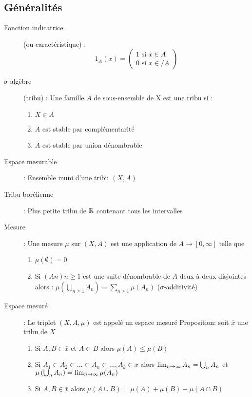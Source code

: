 \subsection{Généralités}
\begin{description}
\item[Fonction indicatrice] (ou caractéristique) : 
    \[1_A(x)=
    \begin{pmatrix}
        1\textrm{ si }x \in A\\
        0\textrm{ si }x \in
    / A
    \end{pmatrix}
    \]
\item[$\sigma$-algèbre] (tribu) : Une famille $A$ de sous-ensemble de X est une tribu si :
    \begin{enumerate}
        \item $X \in A$
        \item $A$ est stable par complémentarité
        \item $A$ est stable par union dénombrable
    \end{enumerate}
\item[Espace mesurable] : Ensemble muni d’une tribu $(X, A)$
\item[Tribu borélienne] : Plus petite tribu de $\mathbb{R}$ contenant tous les intervalles
\item[Mesure] : Une mesure $\mu$ sur $(X, A)$ est une application de $A \rightarrow [0, \infty]$ telle que
    \begin{enumerate}
        \item $\mu(\emptyset) = 0$
        \item Si $(A n ) n\ge 1$ est une suite dénombrable de $A$ deux à deux disjointes alors :
        $\mu\left(\bigcup_{n\ge 1} A_n\right) =
        \sum_{n\ge 1}\mu(A_n)$
        ($\sigma$-additivité)
    \end{enumerate}
\item[Espace mesuré] : Le triplet $(X, A, \mu)$ est appelé un espace mesuré
Proposition: soit $\bar x$ une tribu de $X$
    \begin{enumerate}
        \item Si $A, B \in \bar x$ et $A \subset B$ alors $\mu(A) \le \mu(B)$
        \item Si $A_1 \subset A_2 \subset ... \subset A_n \subset ..., A_k \in \bar x$
        alors
        $\lim_{n\rightarrow\infty}A_n = \bigcup_n A_n$ et $\mu\left(\bigcup_n A_n \right) = \lim_{n\rightarrow\infty}\mu(A_n)$
        \item Si $A, B \in \bar x$
        alors
        $\mu(A \cup B) = \mu(A) + \mu(B) - \mu(A \cap B)$

\end{enumerate}
\end{description}
